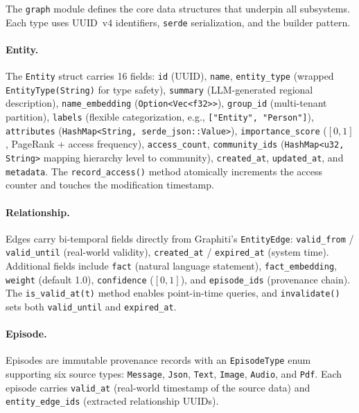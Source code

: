 \documentclass[11pt,a4paper,twocolumn]{article}
\begin{document}
The \texttt{graph} module defines the core data structures that
underpin all subsystems. Each type uses UUID~v4 identifiers,
\texttt{serde} serialization, and the builder pattern.

\paragraph{Entity.}
The \texttt{Entity} struct carries 16 fields: \texttt{id} (UUID),
\texttt{name}, \texttt{entity\_type} (wrapped \texttt{EntityType(String)}
for type safety), \texttt{summary} (LLM-generated regional
description), \texttt{name\_embedding} (\texttt{Option<Vec<f32>>}),
\texttt{group\_id} (multi-tenant partition), \texttt{labels}
(flexible categorization, e.g., \texttt{["Entity", "Person"]}),
\texttt{attributes} (\texttt{HashMap<String, serde\_json::Value>}),
\texttt{importance\_score} ($[0,1]$, PageRank + access frequency),
\texttt{access\_count}, \texttt{community\_ids}
(\texttt{HashMap<u32, String>} mapping hierarchy level to community),
\texttt{created\_at}, \texttt{updated\_at}, and \texttt{metadata}.
The \texttt{record\_access()} method atomically increments the
access counter and touches the modification timestamp.

\paragraph{Relationship.}
Edges carry bi-temporal fields directly from Graphiti's
\texttt{EntityEdge}: \texttt{valid\_from} / \texttt{valid\_until}
(real-world validity), \texttt{created\_at} / \texttt{expired\_at}
(system time). Additional fields include \texttt{fact} (natural
language statement), \texttt{fact\_embedding}, \texttt{weight}
(default 1.0), \texttt{confidence} ($[0,1]$), and
\texttt{episode\_ids} (provenance chain). The \texttt{is\_valid\_at(t)}
method enables point-in-time queries, and \texttt{invalidate()}
sets both \texttt{valid\_until} and \texttt{expired\_at}.

\paragraph{Episode.}
Episodes are immutable provenance records with an \texttt{EpisodeType}
enum supporting six source types: \texttt{Message}, \texttt{Json},
\texttt{Text}, \texttt{Image}, \texttt{Audio}, and \texttt{Pdf}.
Each episode carries \texttt{valid\_at} (real-world timestamp of
the source data) and \texttt{entity\_edge\_ids} (extracted
relationship UUIDs).
\end{document}
